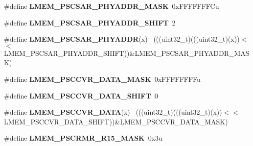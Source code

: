 \begin{DoxyCompactItemize}
\item 
\hypertarget{group___l_m_e_m___register___masks_ga8db42fafdd8f24d8eddf5790705921f6}{}\#define {\bfseries L\+M\+E\+M\+\_\+\+P\+S\+C\+S\+A\+R\+\_\+\+P\+H\+Y\+A\+D\+D\+R\+\_\+\+M\+A\+S\+K}~0x\+F\+F\+F\+F\+F\+F\+F\+Cu\label{group___l_m_e_m___register___masks_ga8db42fafdd8f24d8eddf5790705921f6}

\item 
\hypertarget{group___l_m_e_m___register___masks_gadf10e844eb1854c9846a7e642d6c10d9}{}\#define {\bfseries L\+M\+E\+M\+\_\+\+P\+S\+C\+S\+A\+R\+\_\+\+P\+H\+Y\+A\+D\+D\+R\+\_\+\+S\+H\+I\+F\+T}~2\label{group___l_m_e_m___register___masks_gadf10e844eb1854c9846a7e642d6c10d9}

\item 
\hypertarget{group___l_m_e_m___register___masks_gace34523e3900e2243106720fcf990d57}{}\#define {\bfseries L\+M\+E\+M\+\_\+\+P\+S\+C\+S\+A\+R\+\_\+\+P\+H\+Y\+A\+D\+D\+R}(x)                                  ~(((uint32\+\_\+t)(((uint32\+\_\+t)(x))$<$$<$L\+M\+E\+M\+\_\+\+P\+S\+C\+S\+A\+R\+\_\+\+P\+H\+Y\+A\+D\+D\+R\+\_\+\+S\+H\+I\+F\+T))\&L\+M\+E\+M\+\_\+\+P\+S\+C\+S\+A\+R\+\_\+\+P\+H\+Y\+A\+D\+D\+R\+\_\+\+M\+A\+S\+K)\label{group___l_m_e_m___register___masks_gace34523e3900e2243106720fcf990d57}

\item 
\hypertarget{group___l_m_e_m___register___masks_ga6ae25963ff2330885e6aa38282a72f36}{}\#define {\bfseries L\+M\+E\+M\+\_\+\+P\+S\+C\+C\+V\+R\+\_\+\+D\+A\+T\+A\+\_\+\+M\+A\+S\+K}~0x\+F\+F\+F\+F\+F\+F\+F\+Fu\label{group___l_m_e_m___register___masks_ga6ae25963ff2330885e6aa38282a72f36}

\item 
\hypertarget{group___l_m_e_m___register___masks_ga27567fb766be25d5f00108b9aaffccec}{}\#define {\bfseries L\+M\+E\+M\+\_\+\+P\+S\+C\+C\+V\+R\+\_\+\+D\+A\+T\+A\+\_\+\+S\+H\+I\+F\+T}~0\label{group___l_m_e_m___register___masks_ga27567fb766be25d5f00108b9aaffccec}

\item 
\hypertarget{group___l_m_e_m___register___masks_ga020dba228fa697749046be20e34b2a5d}{}\#define {\bfseries L\+M\+E\+M\+\_\+\+P\+S\+C\+C\+V\+R\+\_\+\+D\+A\+T\+A}(x)                                        ~(((uint32\+\_\+t)(((uint32\+\_\+t)(x))$<$$<$L\+M\+E\+M\+\_\+\+P\+S\+C\+C\+V\+R\+\_\+\+D\+A\+T\+A\+\_\+\+S\+H\+I\+F\+T))\&L\+M\+E\+M\+\_\+\+P\+S\+C\+C\+V\+R\+\_\+\+D\+A\+T\+A\+\_\+\+M\+A\+S\+K)\label{group___l_m_e_m___register___masks_ga020dba228fa697749046be20e34b2a5d}

\item 
\hypertarget{group___l_m_e_m___register___masks_ga60cb7d2ed7018d23195ea6ea55718729}{}\#define {\bfseries L\+M\+E\+M\+\_\+\+P\+S\+C\+R\+M\+R\+\_\+\+R15\+\_\+\+M\+A\+S\+K}~0x3u\label{group___l_m_e_m___register___masks_ga60cb7d2ed7018d23195ea6ea55718729}


\end{DoxyCompactItemize}
